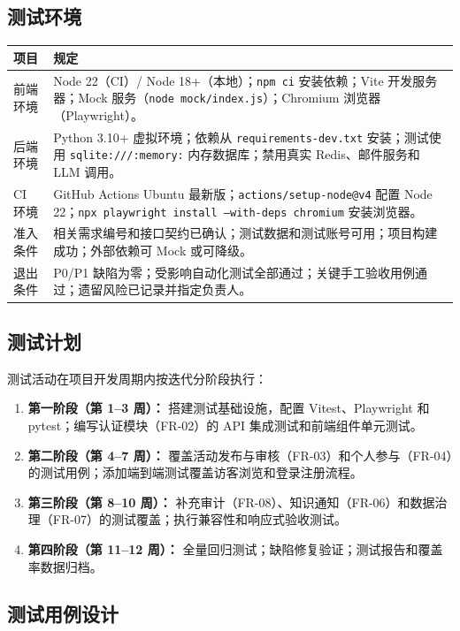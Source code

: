 \documentclass[12pt,a4paper]{ctexart}
\begin{document}
\subsection{测试环境}
\noindent\begin{tabularx}{\textwidth}{p{2.6cm}Y}
\toprule 项目 & 规定 \\\midrule
前端环境 & Node 22（CI）/ Node 18+（本地）；\texttt{npm ci} 安装依赖；Vite 开发服务器；Mock 服务（\texttt{node mock/index.js}）；Chromium 浏览器（Playwright）。 \\
后端环境 & Python 3.10+ 虚拟环境；依赖从 \texttt{requirements-dev.txt} 安装；测试使用 \texttt{sqlite:///:memory:} 内存数据库；禁用真实 Redis、邮件服务和 LLM 调用。 \\
CI 环境 & GitHub Actions Ubuntu 最新版；\texttt{actions/setup-node@v4} 配置 Node 22；\texttt{npx playwright install --with-deps chromium} 安装浏览器。 \\
准入条件 & 相关需求编号和接口契约已确认；测试数据和测试账号可用；项目构建成功；外部依赖可 Mock 或可降级。 \\
退出条件 & P0/P1 缺陷为零；受影响自动化测试全部通过；关键手工验收用例通过；遗留风险已记录并指定负责人。 \\
\bottomrule
\end{tabularx}

\subsection{测试计划}
测试活动在项目开发周期内按迭代分阶段执行：
\begin{enumerate}
\item \textbf{第一阶段（第 1--3 周）：} 搭建测试基础设施，配置 Vitest、Playwright 和 pytest；编写认证模块（FR-02）的 API 集成测试和前端组件单元测试。
\item \textbf{第二阶段（第 4--7 周）：} 覆盖活动发布与审核（FR-03）和个人参与（FR-04）的测试用例；添加端到端测试覆盖访客浏览和登录注册流程。
\item \textbf{第三阶段（第 8--10 周）：} 补充审计（FR-08）、知识通知（FR-06）和数据治理（FR-07）的测试覆盖；执行兼容性和响应式验收测试。
\item \textbf{第四阶段（第 11--12 周）：} 全量回归测试；缺陷修复验证；测试报告和覆盖率数据归档。
\end{enumerate}

\subsection{测试用例设计}
\end{document}
